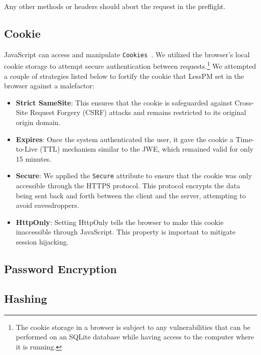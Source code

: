 Any other methods or headers should abort the request in the preflight.

\subsection{Cookie}\label{subsec:cookie}
JavaScript can access and manipulate \texttt{Cookies}~\cite{he2019malicious}.
We utilized the browser's local cookie storage to attempt secure authentication
between requests.\footnote{
  The cookie storage in a browser is subject to any vulnerabilities that can be
  performed on an SQLite database while having access to the computer where it
  is running.
}
We attempted a couple of strategies listed below to fortify the cookie that
LessPM set in the browser against a malefactor:
\begin{itemize}
  \item \textbf{Strict SameSite}:
  This ensures that the cookie is safeguarded against Cross-Site Request Forgery
  (CSRF) attacks and remains restricted to its original origin domain.
  \item \textbf{Expires}:
  Once the system authenticated the user, it gave the cookie a Time-to-Live
  (TTL) mechanism similar to the JWE, which remained valid for only 15 minutes.
  \item \textbf{Secure}:
  We applied the \texttt{Secure} attribute to ensure that the cookie was only
  accessible through the HTTPS protocol.
  This protocol encrypts the data being sent back and forth between the client
  and the server, attempting to avoid eavesdroppers.
  \item \textbf{HttpOnly}:
  Setting HttpOnly tells the browser to make this cookie inaccessible through
  JavaScript.
  This property is important to mitigate session hijacking.
\end{itemize}

\subsection{Password Encryption}\label{subsec:password-encryption}


\subsection{Hashing}\label{subsec:hashing}


